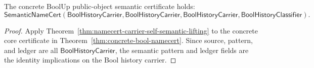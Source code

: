 \begin{theorem}
\label{thm:bool-concrete-semantic-namecert}
The concrete BoolUp public-object semantic certificate holds:
$$
\mathsf{SemanticNameCert}(\mathsf{BoolHistoryCarrier},\mathsf{BoolHistoryCarrier},
\mathsf{BoolHistoryCarrier},\mathsf{BoolHistoryClassifier}).
$$
\end{theorem}
\begin{proof}
Apply Theorem~\ref{thm:namecert-carrier-self-semantic-lifting} to the concrete
core certificate in Theorem~\ref{thm:concrete-bool-namecert}. Since source,
pattern, and ledger are all $\mathsf{BoolHistoryCarrier}$, the semantic pattern
and ledger fields are the identity implications on the Bool history carrier.
\end{proof}




